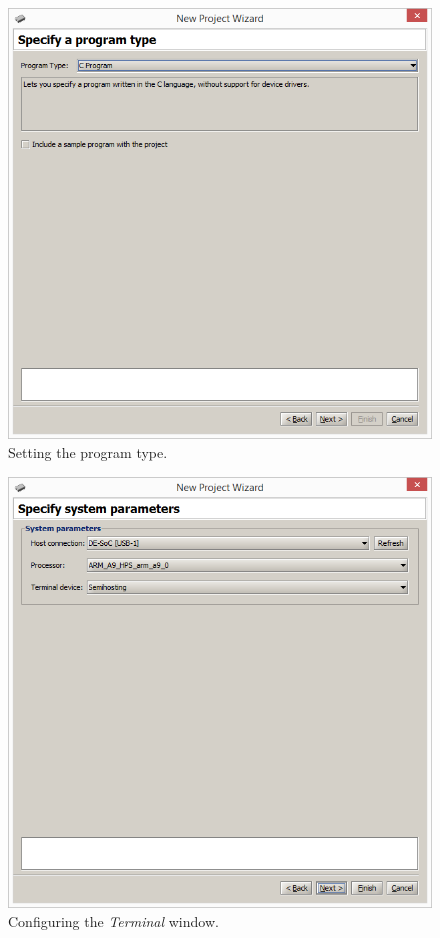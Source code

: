 \documentclass[epsfig,10pt,fullpage]{article}
\begin{document}
\begin{figure}[htb]
	\begin{center}
	\includegraphics[scale=0.58]{figures/figureMP_progtype.png}
	\end{center}
	\vspace{-0.25cm}\caption{Setting the program type.}
\label{fig:MPprogtype}
\end{figure}
\begin{figure}[htb]
	\begin{center}
	\includegraphics[scale=0.58]{figures/figureMP_terminal.png}
	\end{center}
	\vspace{-0.25cm}\caption{Configuring the {\it Terminal} window.}
\label{fig:MPterminal}
\end{figure}
\end{document}
